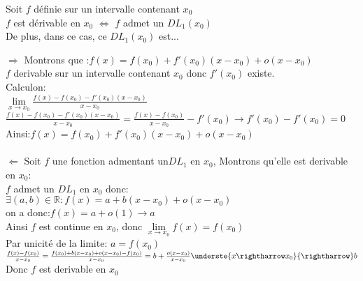 \documentclass{article}
\date{27 Janvier 2024}
\begin{document}
	\maketitle
 
	\begin{question_kholle}
		{Soit $f$ définie sur un intervalle contenant $x_0$ \\
		$f$ est dérivable en $x_0$ $\iff$ $f$ admet un $DL_1(x_0)$\\
		De plus, dans ce cas, ce $DL_1(x_0)$ est... }
  
		$\Rightarrow$ Montrons que :$f(x)=f(x_0)+f'(x_0)(x-x_0)+o(x-x_0)$\\
		$f$ derivable sur un intervalle contenant $x_0$ donc $f'(x_0)$ existe.\\
  
		Calculon:\\
		$\lim\limits_{x \to x_0} \frac{f(x)-f(x_0)-f'(x_0)(x-x_0)}{x-x_0}$\\
		$\frac{f(x)-f(x_0)-f'(x_0)(x-x_0)}{x-x_0}=\frac{f(x)-f(x_0)}{x-x_0}-f'(x_0) \to f'(x_0)-f'(x_0)=0$\\
		Ainsi:$f(x)=f(x_0)+f'(x_0)(x-x_0)+o(x-x_0)$\\\\
		$\Leftarrow$ Soit $f$ une fonction admentant un$DL_1$ en $x_0$, Montrons qu'elle est derivable en $x_0$:\\
		$f$ admet un $DL_1$ en $x_0$ donc:\\
		$\exists (a,b)\in \mathbb{R}:f(x)=a+b(x-x_0)+o(x-x_0)$\\
		on a donc:$f(x)=a+o(1)\to a$\\
		Ainsi $f$ est continue en $x_0$, donc $\lim\limits_{x \to x_0}f(x)=f(x_0)$\\
		Par unicité de la limite: $a=f(x_0)$\\
		$\frac{f(x)-f(x_0)}{x-x_0}=\frac{f(x_0)+b(x-x_0)+o(x-x_0)-f(x_0)}{x-x_0}=b+\frac{o(x-x_0)}{x-					x_0}\underste{x\rightharrow x_0}{\rightharrow} b$\\
		Donc $f$ est derivable en $x_0$


	\end{question_kholle}
\end{document}
